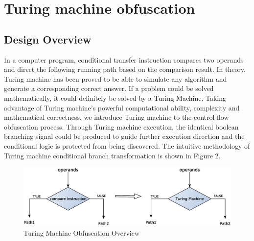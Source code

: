 \documentclass[lnicst]{svmultln}
\begin{document}
%
\section{Turing machine obfuscation}
%
\subsection{Design Overview}
In a computer program, conditional transfer instruction compares two operands and direct the following running path based on the comparison result. In theory, Turing machine has been proved to be able to simulate any algorithm and generate a corresponding correct answer. If a problem could be solved mathematically, it could definitely be solved by a Turing Machine. Taking advantage of Turing machine's powerful computational ability, complexity and mathematical correctness, we introduce Turing machine to the control flow obfuscation process. Through Turing machine execution, the identical boolean branching signal could be produced to guide further execution direction and the conditional logic is protected from being discovered. The intuitive methodology of Turing machine conditional branch transformation is shown in Figure 2.
\begin{figure}
 \includegraphics[width=\linewidth]{figure2.eps}
 \caption{Turing Machine Obfuscation Overview}
 \label{Figure 2}
\end{figure}
\end{document}
